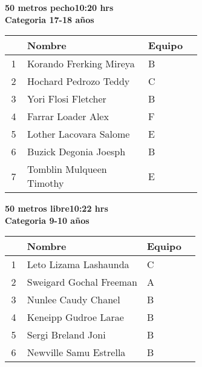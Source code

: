\begin{minipage}{0.95\linewidth}\vspace{0.5cm} 
\begin{flushleft}
\textbf{
\hspace{-0.15cm}50 metros pecho\hspace{1.5cm}10:20 hrs \\Categoria 17-18 años}\vspace{-0.2cm} 
\end{flushleft}
\begin{tabular}{cp{0.63\linewidth}l}
\hline
& \textbf{Nombre} & \textbf{Equipo} \\ \hline
1 & Korando Frerking Mireya & B \\ 
2 & Hochard Pedrozo Teddy & C \\ 
3 & Yori Flosi Fletcher & B \\ 
4 & Farrar Loader Alex & F \\ 
5 & Lother Lacovara Salome & E \\ 
6 & Buzick Degonia Joesph & B \\ 
7 & Tomblin Mulqueen Timothy & E \\ 
\end{tabular}
\end{minipage}
\begin{minipage}{0.95\linewidth}\vspace{0.5cm} 
\begin{flushleft}
\textbf{
\hspace{-0.15cm}50 metros libre\hspace{1.5cm}10:22 hrs \\Categoria 9-10 años}\vspace{-0.2cm} 
\end{flushleft}
\begin{tabular}{cp{0.63\linewidth}l}
\hline
& \textbf{Nombre} & \textbf{Equipo} \\ \hline
1 & Leto Lizama Lashaunda & C \\ 
2 & Sweigard Gochal Freeman & A \\ 
3 & Nunlee Caudy Chanel & B \\ 
4 & Keneipp Gudroe Larae & B \\ 
5 & Sergi Breland Joni & B \\ 
6 & Newville Samu Estrella & B \\ 
\end{tabular}
\end{minipage}
